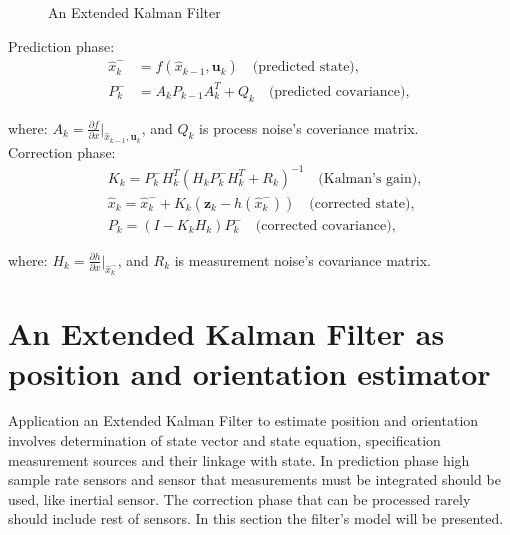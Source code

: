 \begin{figure}[!h]
	\centering
	\caption{An Extended Kalman Filter}
	\label{kf_diagram}
\end{figure}

Prediction phase:
\[
\begin{aligned}
	\hat{x}_k^- & = f(\hat{x}_{k-1}, \bm{u}_k) \quad \text{(predicted state)}, \\
	P_k^- & = A_k P_{k-1} A_k^T + Q_k \quad \text{(predicted covariance)},
\end{aligned}
\]

where: $A_k = \frac{\partial f}{\partial x}\Bigr|_{\hat{x}_{k-1}, \bm{u}_k}$, and $Q_k$ is process noise's coveriance matrix.\\

Correction phase:
\[
\begin{aligned}
	&K_k = P_k^- H_k^T (H_k P_k^- H_k^T + R_k)^{-1} \quad \text{(Kalman's gain)}, \\
	&\hat{x}_k = \hat{x}_k^- + K_k(\bm{z}_k - h(\hat{x}_k^-)) \quad \text{(corrected state)}, \\
	&P_k = (I - K_k H_k) P_k^- \quad \text{(corrected covariance)},
\end{aligned}
\]

where: $H_k = \frac{\partial h}{\partial x}\Bigr|_{\hat{x}_k^-}$, and $R_k$ is measurement noise's covariance matrix.



\section{An Extended Kalman Filter as position and orientation estimator}
\label{filter_model}

Application an Extended Kalman Filter to estimate position and orientation involves determination of state vector and state equation, specification measurement sources and their linkage with state. In prediction phase high sample rate sensors and sensor that measurements must be integrated should be used, like inertial sensor. The correction phase that can be processed rarely should include rest of sensors. In this section the filter's model will be presented.\\

